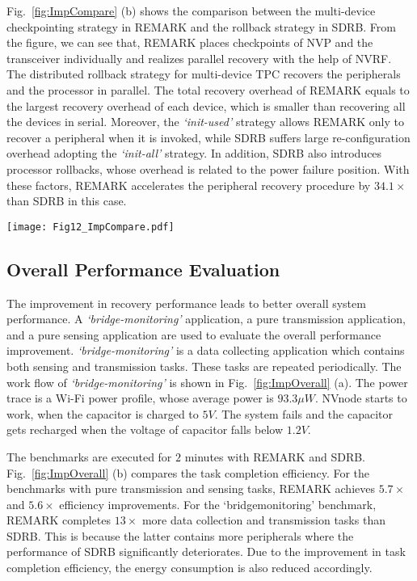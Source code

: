 Fig.~\ref{fig:ImpCompare} (b) shows the comparison between the multi-device checkpointing strategy in REMARK and the rollback strategy in SDRB.
From the figure, we can see that, REMARK places checkpoints of NVP and the transceiver individually and realizes parallel recovery with the help of NVRF.
The distributed rollback strategy for multi-device TPC recovers the peripherals and the processor in parallel.
The total recovery overhead of REMARK equals to the largest recovery overhead of each device, which is smaller than recovering all the devices in serial.
Moreover, the \emph{`init-used'} strategy allows REMARK only to recover a peripheral when it is invoked, while SDRB suffers large re-configuration overhead adopting the \emph{`init-all'} strategy.
In addition, SDRB also introduces processor rollbacks, whose overhead is related to the power failure position.
With these factors, REMARK accelerates the peripheral recovery procedure by $34.1\times$ than SDRB in this case.

%
\begin{figure*}[htpb]
    \centering
    \texttt{[image: Fig12\_ImpCompare.pdf]}
    \caption{Recover overhead and task completeness comparison between REMARK and SDRB.}
    \label{fig:ImpCompare}
\end{figure*}

\subsection{Overall Performance Evaluation} \label{sec:implOverall}
%
The improvement in recovery performance leads to better overall system performance. 
A \emph{`bridge-monitoring'} application, a pure transmission application, and a pure sensing application are used to evaluate the overall performance improvement.
\emph{`bridge-monitoring'} is a data collecting application which contains both sensing and transmission tasks. 
These tasks are repeated periodically.
The work flow of \emph{`bridge-monitoring'} is shown in Fig.~\ref{fig:ImpOverall} (a).
The power trace is a Wi-Fi power profile, whose average power is $93.3\mu W$.
NVnode starts to work, when the capacitor is charged to $5V$.
The system fails and the capacitor gets recharged when the voltage of capacitor falls below $1.2V$.

The benchmarks are executed for $2$ minutes with REMARK and SDRB.
Fig.~\ref{fig:ImpOverall} (b) compares the task completion efficiency.
For the benchmarks with pure transmission and sensing tasks, REMARK achieves $5.7\times$ and $5.6\times$ efficiency improvements.
For the ‘bridgemonitoring’ benchmark, REMARK completes $13\times$ more data collection and transmission tasks than SDRB.
This is because the latter contains more peripherals where the performance of SDRB significantly deteriorates.
Due to the improvement in task completion efficiency, the energy consumption is also reduced accordingly. 

